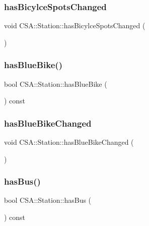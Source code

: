 \subsubsection{\texorpdfstring{has\+Bicylce\+Spots\+Changed}{hasBicylceSpotsChanged}}
{\footnotesize\ttfamily void C\+S\+A\+::\+Station\+::has\+Bicylce\+Spots\+Changed (\begin{DoxyParamCaption}{ }\end{DoxyParamCaption})\hspace{0.3cm}{\ttfamily [signal]}}

\mbox{\label{classCSA_1_1Station_af3be093b4e7bbad8c76de068804765e6}} 
\subsubsection{\texorpdfstring{has\+Blue\+Bike()}{hasBlueBike()}}
{\footnotesize\ttfamily bool C\+S\+A\+::\+Station\+::has\+Blue\+Bike (\begin{DoxyParamCaption}{ }\end{DoxyParamCaption}) const}

\mbox{\label{classCSA_1_1Station_a87ad9a5b8c69aca367ed1a5d65616ddb}} 
\subsubsection{\texorpdfstring{has\+Blue\+Bike\+Changed}{hasBlueBikeChanged}}
{\footnotesize\ttfamily void C\+S\+A\+::\+Station\+::has\+Blue\+Bike\+Changed (\begin{DoxyParamCaption}{ }\end{DoxyParamCaption})\hspace{0.3cm}{\ttfamily [signal]}}

\mbox{\label{classCSA_1_1Station_a02fa7a1b47bc2b7170f8817d49d6f992}} 
\subsubsection{\texorpdfstring{has\+Bus()}{hasBus()}}
{\footnotesize\ttfamily bool C\+S\+A\+::\+Station\+::has\+Bus (\begin{DoxyParamCaption}{ }\end{DoxyParamCaption}) const}

